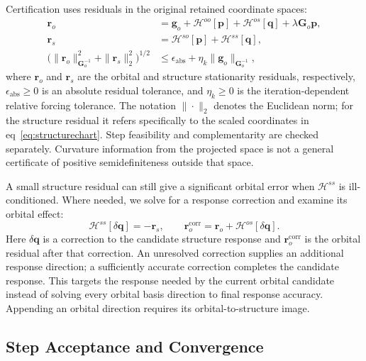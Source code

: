 \documentclass[12pt]{article}
\begin{document}
Certification uses residuals in the original retained coordinate spaces:
\begin{equation}
 \begin{aligned}
 \mathbf r_o&=\mathbf g_o+\mathcal H^{oo}[\mathbf p]+\mathcal H^{os}[\mathbf q]
                  +\lambda\mathbf G_o\mathbf p,\\
 \mathbf r_s&=\mathcal H^{so}[\mathbf p]+\mathcal H^{ss}[\mathbf q],\\
 \big(\|\mathbf r_o\|_{\mathbf G_o^{-1}}^2+\|\mathbf r_s\|_2^2\big)^{1/2}
 &\leq\epsilon_{\mathrm{abs}}+\eta_k\|\mathbf g_o\|_{\mathbf G_o^{-1}},
 \end{aligned}
 \label{eq:residual}
\end{equation}
where \(\mathbf r_o\) and \(\mathbf r_s\) are the orbital and structure stationarity residuals, respectively, \(\epsilon_{\mathrm{abs}}\geq0\) is an absolute residual tolerance, and \(\eta_k\geq0\) is the iteration-dependent relative forcing tolerance. The notation \(\|\cdot\|_2\) denotes the Euclidean norm; for the structure residual it refers specifically to the scaled coordinates in eq~\eqref{eq:structurechart}. Step feasibility and complementarity are checked separately. Curvature information from the projected space is not a general certificate of positive semidefiniteness outside that space.

A small structure residual can still give a significant orbital error when \(\mathcal H^{ss}\) is ill-conditioned. Where needed, we solve for a response correction and examine its orbital effect:
\begin{equation}
 \mathcal H^{ss}[\delta\mathbf q]=-\mathbf r_s,\qquad
 \mathbf r_o^{\mathrm{corr}}=\mathbf r_o+\mathcal H^{os}[\delta\mathbf q].
 \label{eq:responsecertificate}
\end{equation}
Here \(\delta\mathbf q\) is a correction to the candidate structure response and \(\mathbf r_o^{\mathrm{corr}}\) is the orbital residual after that correction. An unresolved correction supplies an additional response direction; a sufficiently accurate correction completes the candidate response. This targets the response needed by the current orbital candidate instead of solving every orbital basis direction to final response accuracy. Appending an orbital direction requires its orbital-to-structure image.

\subsection{Step Acceptance and Convergence}
\end{document}
